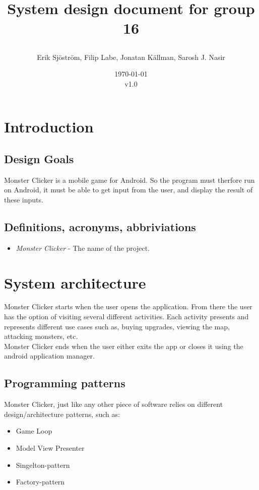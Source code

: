 \documentclass{article}
\title{
    System design document for group 16
    \author{Erik Sjöström,
            Filip Labe,
            Jonatan Källman,
            Sarosh J. Nasir}
    \date{\today \\v1.0}         
}
\begin{document}
\maketitle

\section{Introduction}

\subsection{Design Goals}

Monster Clicker is a mobile game for Android. So the program must therfore run on Android,
it must be able to get input from the user, and display the result of these inputs. 

\subsection{Definitions, acronyms, abbriviations}
\begin{itemize}
    \item \emph{Monster Clicker} - The name of the project.
\end{itemize}

\section{System architecture}

Monster Clicker starts when the user opens the application. From there the user has
the option of visiting several different activities. Each activity presents and
represents different use cases such as, buying upgrades, viewing the map, attacking monsters, etc. \\ \noindent
Monster Clicker ends when the user either exits the app or closes it using the android application manager.

\subsection{Programming patterns}
Monster Clicker, just like any other piece of software relies on different design/architecture patterns, such as:
\begin{itemize}
    \item Game Loop \cite{game-loop}
    \item Model View Presenter \cite{MVP}
    \item Singelton-pattern
    \item Factory-pattern
\end{itemize}
\end{document}
